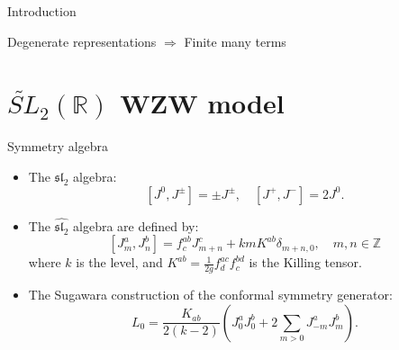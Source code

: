 \documentclass{beamer}
\begin{document}
\begin{frame}{Introduction}
    \begin{block}{}
      \begin{center}
        Degenerate representations $\Longrightarrow $ Finite many terms
      \end{center}
    \end{block}
\end{frame}

\section{\texorpdfstring{$\widetilde{SL}_{2}(\mathbb{R})$}{Lg} WZW model}

\begin{frame}{Symmetry algebra}
  \begin{itemize}
    \item The $\mathfrak{sl}_{2}$ algebra: 
      \begin{equation*}
        \left[J^{0}, J^{\pm}\right] = \pm J^{\pm}, \quad \left[J^{+}, J^{-}\right] = 2 J^{0}.
      \end{equation*}
    \item The $\widehat{\mathfrak{sl}_{2}}$ algebra are defined by:
      \begin{equation*}
          \left[ J^{a}_{m}, J^{b}_{n} \right] = f^{ab}_{c} J^{c}_{m+n} + k m K^{ab} \delta_{m+n,0}, \quad m,n \in \mathbb{Z}
      \end{equation*}
      where $k$ is the level, and $K^{ab} = \frac{1}{2g} f^{ac}_{d}f^{bd}_{c}$ is the Killing tensor.
    \item The Sugawara construction of the conformal symmetry generator:
      \begin{equation*}
        L_{0} = \frac{K_{ab}}{2(k-2)} \left(J^{a}_{0}J^{b}_{0} + 2\sum_{m > 0 } J^{a}_{-m} J^{b}_{m}\right).
      \end{equation*}
  \end{itemize}
\end{frame}
\end{document}

